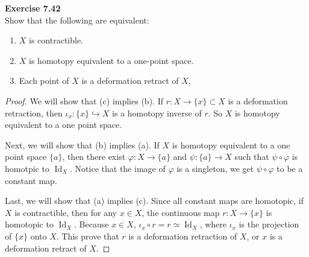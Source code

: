 \documentclass[12pt, a4paper]{article}
\theoremstyle{plain}
\def\phi{\varphi}
\DeclareMathOperator{\Id}{Id}
\newenvironment{exercise}[2][Exercise]
    { \begin{mdframed}[backgroundcolor=gray!20] \textbf{#1 #2} \\}
    {  \end{mdframed}}
\begin{document}
\begin{exercise}{7.42}
    Show that the following are equivalent:
    \begin{enumerate}[label=(\alph*)]
        \item $X$ is contractible.
        \item $X$ is homotopy equivalent to a one-point space.
        \item Each point of $X$ is a deformation retract of $X$,
    \end{enumerate}
\end{exercise}
    \begin{proof}


        
        We will show that (c) implies (b). If $r\colon X\to \{x\}\subset X$ is a deformation retraction, then $\iota_{x}\colon \{x\}\hookrightarrow X$ is a homotopy inverse of $r$. So $X$ is homotopy equivalent to a one point space.

        Next, we will show that (b) implies (a). If $X$ is homotopy equivalent to a one point space $\{a\}$, then there exist $\phi\colon X\to \{a\}$ and $\psi\colon \{a\}\to X$ such that $\psi\circ \phi$ is homotpic to $\Id_X$. Notice that the image of $\phi$ is a singleton, we get $\psi\circ \phi$ to be a constant map.

        Last, we will show that (a) implies (c). Since all constant maps are homotopic, if $X$ is contractible, then for any $x\in X$, the continuous map $r\colon X\to \{x\}$ is homotopic to $\Id_X$. Because $x\in X$, $\iota_x\circ r = r\simeq \Id_X$, where $\iota_x$ is the projection of $\{x\}$ onto $X$. This prove that $r$ is a deformation retraction of $X$, or $x$ is a deformation retract of $X$.
    \end{proof}
\end{document}
